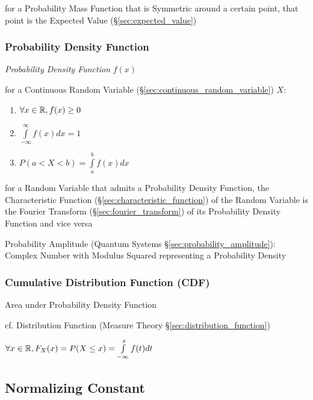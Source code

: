for a Probability Mass Function that is Symmetric around a certain point, that
point is the Expected Value (\S\ref{sec:expected_value})



\subsubsection{Probability Density Function}\label{sec:pdf}

\emph{Probability Density Function} $f(x)$

for a Continuous Random Variable (\S\ref{sec:continuous_random_variable}) $X$:
\begin{enumerate}
  \item $\forall x \in \mathbb{R}, f(x) \geq 0$
  \item $\int\limits_{-\infty}^{\infty} f(x) dx = 1$
  \item $P (a < X < b) = \int\limits_a^b f(x) dx$
\end{enumerate}

for a Random Variable that admits a Probability Density Function, the
Characteristic Function (\S\ref{sec:characteristic_function}) of the Random
Variable is the Fourier Transform (\S\ref{sec:fourier_transform}) of its
Probability Density Function and vice versa

\fist Probability Amplitude (Quantum Systems \S\ref{sec:probability_amplitude}):
Complex Number with Modulus Squared representing a Probability Density



\subsubsection{Cumulative Distribution Function (CDF)}\label{sec:cdf}

Area under Probability Density Function

cf. Distribution Function (Measure Theory \S\ref{sec:distribution_function})

$\forall x \in \mathbb{R}, F_X(x) = P(X \leq x) = \int\limits_{-\infty}^x
f(t) dt$



\subsection{Normalizing Constant}\label{sec:normalizing_constant}



